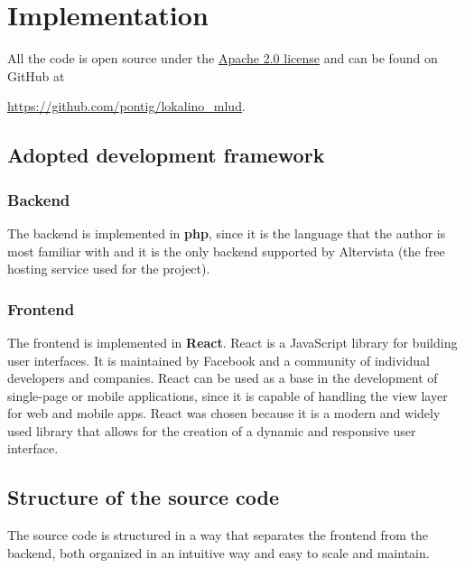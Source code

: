 \chapter{Implementation}

All the code is open source under the \href{https://www.apache.org/licenses/LICENSE-2.0}{Apache 2.0 license} and can be found on GitHub at

\begin{center}    
    \url{https://github.com/pontig/lokalino_mlud}.
\end{center}

\section{Adopted development framework}

\subsection*{Backend}

The backend is implemented in \textbf{php}, since it is the language that the author is most familiar with and it is the only backend supported by Altervista (the free hosting service used for the project).

\subsection*{Frontend}

The frontend is implemented in \textbf{React}. React is a JavaScript library for building user interfaces. It is maintained by Facebook and a community of individual developers and companies. React can be used as a base in the development of single-page or mobile applications, since it is capable of handling the view layer for web and mobile apps. React was chosen because it is a modern and widely used library that allows for the creation of a dynamic and responsive user interface.

\section{Structure of the source code}
The source code is structured in a way that separates the frontend from the backend, both organized in an intuitive way and easy to scale and maintain.

